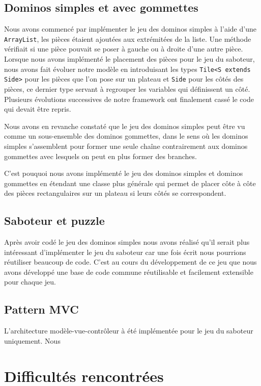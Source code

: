 \documentclass[a4paper, 11pt, DIV=9]{scrartcl}
\begin{document}
\subsection{Dominos simples et avec gommettes}
Nous avons commencé par implémenter le jeu des dominos simples à l'aide d'une
\texttt{ArrayList}, les pièces étaient ajoutées aux extrémitées de la liste. Une
méthode vérifiait si une pièce pouvait se poser à gauche ou à droite d'une autre
pièce. Lorsque nous avons implémenté le placement des pièces pour le jeu du
saboteur, nous avons fait évoluer notre modèle en introduisant les types \texttt{Tile<S
extends Side>} pour les pièces que l'on pose sur un plateau et \texttt{Side}
pour les côtés des pièces, ce dernier type servant à regrouper les variables qui
définissent un côté. Plusieurs évolutions successives de notre framework ont
finalement cassé le code qui devait être repris.

Nous avons en revanche constaté que le jeu des dominos simples peut être vu
comme un sous-ensemble des dominos gommettes, dans le sens où les dominos
simples s'assemblent pour former une seule chaîne contrairement aux dominos
gommettes avec lesquels on peut en plus former des branches.

C'est pouquoi nous avons implémenté le jeu des dominos simples et dominos
gommettes en étendant une classe plus générale qui permet de placer côte à côte
des pièces rectangulaires sur un plateau si leurs côtés se correspondent.

%


\subsection{Saboteur et puzzle}

Après avoir codé le jeu des dominos simples nous avons réalisé qu'il serait plus
intéressant d'implémenter le jeu du saboteur car une fois écrit nous pourrions
réutiliser beaucoup de code. C'est au cours du développement de ce jeu que nous
avons développé une base de code commune réutilisable et facilement extensible
pour chaque jeu.

\subsection{Pattern MVC}

L'architecture modèle-vue-contrôleur à été implémentée pour le jeu du saboteur
uniquement. Nous

\section{Difficultés rencontrées}
\end{document}
